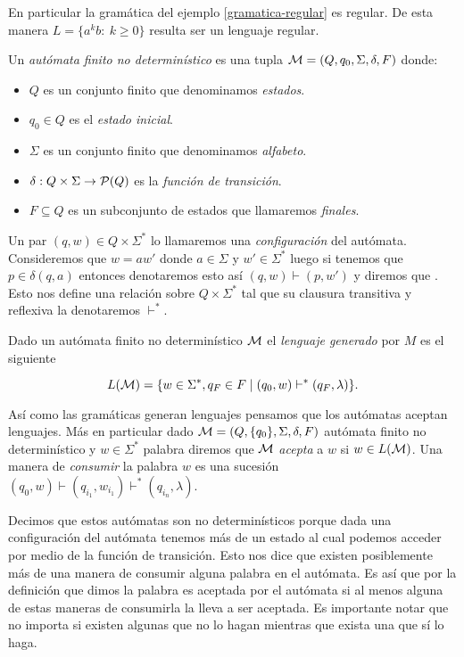 \documentclass[tesis.tex]{subfiles}
\begin{document}
En particular la gramática del ejemplo \ref{gramatica-regular} es regular. 
De esta manera $L= \{ a^k b : \ k \ge 0  \}$ resulta ser un lenguaje regular.


\begin{deff}
	Un \emph{autómata finito no determinístico} es una tupla ${\cal M} = (Q,q_0,\Sigma,\delta,F)$ donde:
	\begin{itemize}
		\item $Q$ es un conjunto finito que denominamos \emph{estados}.
		\item $q_0 \in Q$ es el \emph{estado inicial}.
		\item $\Sigma$ es un conjunto finito que denominamos \emph{alfabeto}.
		\item $\delta:Q \times \Sigma \to {\cal P}(Q)$ es la \emph{función de transición}.
		\item $F \subseteq Q$ es un subconjunto de estados que llamaremos \emph{finales}.
	\end{itemize}
\end{deff}

Un par $(q,w) \in Q \times \Sigma^*$ lo llamaremos una \emph{configuración} del autómata.
Consideremos que $w = aw'$ donde $a \in \Sigma$ y $w' \in \Sigma^*$ luego si tenemos que $p \in \delta(q,a) $ entonces denotaremos esto así $(q,w) \vdash (p,w')$ y diremos que .
Esto nos define una relación sobre $Q \times \Sigma^*$ tal que su clausura transitiva y reflexiva 
la denotaremos $\vdash^*$.


\begin{deff}
	Dado un autómata finito no determinístico $\cal M$ el \emph{lenguaje generado} por $M$ es el siguiente
	
	\[
	L({\cal M} ) = \{  w \in \Sigma^*, q_F \in F \mid (q_0,w) \vdash^* (q_F,\lambda)     \}.
	\]
\end{deff}
\medskip

Así como las gramáticas generan lenguajes pensamos que los autómatas aceptan lenguajes.
Más en particular dado ${\cal M} = (Q,\{q_0\},\Sigma,\delta,F)$ autómata finito no determinístico y $w \in \Sigma^*$ palabra diremos que $\cal M$ \emph{acepta} a $w$ si $w \in L(\cal M)$.
Una manera de \emph{consumir} la palabra $w$ es una sucesión $(q_0,w) \vdash (q_{i_{1}}, w_{i_{1}}) \vdash^{*} (q_{i_{n}}, \lambda)$.

\medskip

\begin{obs}
	Decimos que estos autómatas son no determinísticos porque dada una configuración del autómata tenemos más de un estado al cual podemos acceder por medio de la función de transición.
	Esto nos dice que existen posiblemente más de una manera de consumir alguna palabra en el autómata. 
	Es así que por la definición que dimos la palabra es aceptada por el autómata si al menos alguna de estas maneras de consumirla la lleva a ser aceptada.
	Es importante notar que no importa si existen algunas que no lo hagan mientras que exista una que sí lo haga. 
\end{obs}
\end{document}
